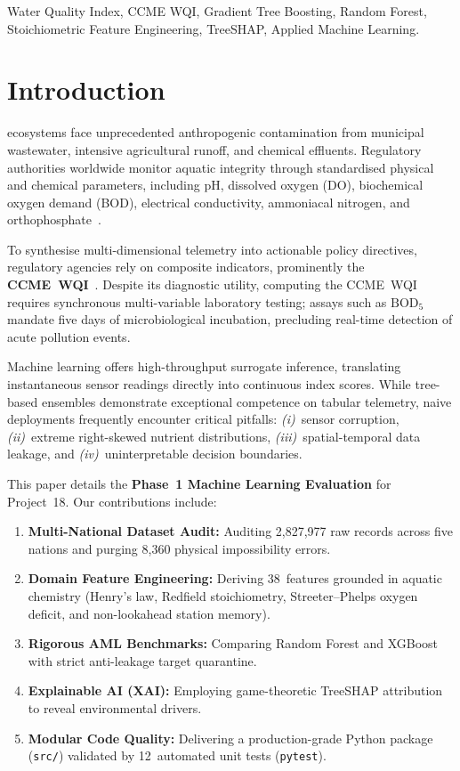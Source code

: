 \documentclass[conference]{IEEEtran}
\begin{document}
\begin{IEEEkeywords}
Water Quality Index, CCME WQI, Gradient Tree Boosting, Random Forest,
Stoichiometric Feature Engineering, TreeSHAP, Applied Machine Learning.
\end{IEEEkeywords}

\section{Introduction}
\label{sec:intro}

 ecosystems face unprecedented anthropogenic
contamination from municipal wastewater, intensive agricultural runoff,
and chemical effluents. Regulatory authorities worldwide monitor
aquatic integrity through standardised physical and chemical
parameters, including pH, dissolved oxygen (DO), biochemical oxygen
demand (BOD), electrical conductivity, ammoniacal nitrogen, and
orthophosphate~\cite{tyree2019surface}.

To synthesise multi-dimensional telemetry into actionable policy
directives, regulatory agencies rely on composite indicators,
prominently the \textbf{CCME~WQI}~\cite{ccme2001wqi}. Despite its
diagnostic utility, computing the CCME~WQI requires synchronous
multi-variable laboratory testing; assays such as $\text{BOD}_5$
mandate five days of microbiological incubation, precluding real-time
detection of acute pollution events.

Machine learning offers high-throughput surrogate inference,
translating instantaneous sensor readings directly into continuous
index scores. While tree-based ensembles demonstrate exceptional
competence on tabular telemetry, naive deployments frequently encounter
critical pitfalls: \emph{(i)}~sensor corruption, \emph{(ii)}~extreme
right-skewed nutrient distributions, \emph{(iii)}~spatial-temporal data
leakage, and \emph{(iv)}~uninterpretable decision boundaries.

This paper details the \textbf{Phase~1 Machine Learning Evaluation} for
Project~18. Our contributions include:
\begin{enumerate}
  \item \textbf{Multi-National Dataset Audit:} Auditing 2,827,977 raw
        records across five nations and purging 8,360 physical
        impossibility errors.
  \item \textbf{Domain Feature Engineering:} Deriving 38~features
        grounded in aquatic chemistry (Henry's law, Redfield
        stoichiometry, Streeter--Phelps oxygen deficit, and non-lookahead
        station memory).
  \item \textbf{Rigorous AML Benchmarks:} Comparing Random Forest and
        XGBoost with strict anti-leakage target quarantine.
  \item \textbf{Explainable AI (XAI):} Employing game-theoretic
        TreeSHAP attribution to reveal environmental drivers.
  \item \textbf{Modular Code Quality:} Delivering a production-grade
        Python package (\texttt{src/}) validated by 12~automated unit
        tests (\texttt{pytest}).
\end{enumerate}
\end{document}
